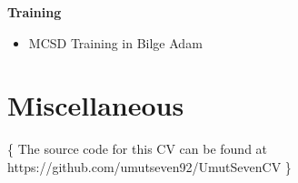 \documentclass[11pt,a4paper,sans]{moderncv}        %
\begin{document}
\textbf{Training}
\begin{itemize}
\item MCSD Training in Bilge Adam\newline{}
\end{itemize}

\vspace{5px}


\section{Miscellaneous}
\vspace{5px}


               
\vspace*{\fill}
\color{color2} \centerline{\{ The source code for this CV can be found at https://github.com/umutseven92/UmutSevenCV \}}
\end{document}
